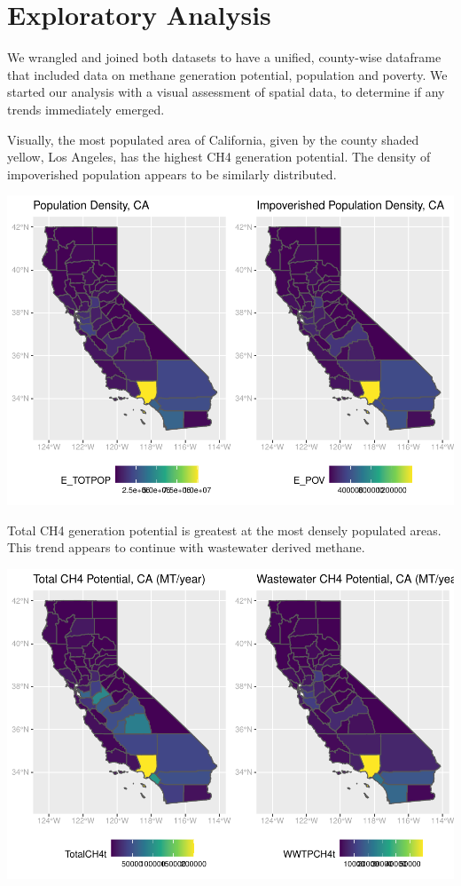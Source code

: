 \documentclass[
  12pt,
]{article}
\begin{document}
\newpage

\hypertarget{exploratory-analysis}{%
\section{Exploratory Analysis}\label{exploratory-analysis}}

We wrangled and joined both datasets to have a unified, county-wise
dataframe that included data on methane generation potential, population
and poverty. We started our analysis with a visual assessment of spatial
data, to determine if any trends immediately emerged.

Visually, the most populated area of California, given by the county
shaded yellow, Los Angeles, has the highest CH4 generation potential.
The density of impoverished population appears to be similarly
distributed.

\includegraphics{FDR_ProjectReport_files/figure-latex/unnamed-chunk-2-1.pdf}

Total CH4 generation potential is greatest at the most densely populated
areas. This trend appears to continue with wastewater derived methane.

\includegraphics{FDR_ProjectReport_files/figure-latex/unnamed-chunk-3-1.pdf}
\end{document}
